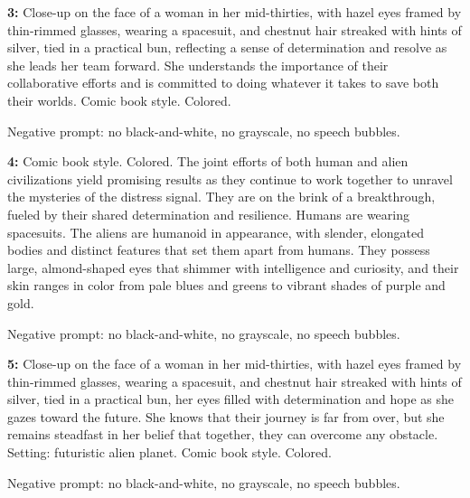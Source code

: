 \begin{iquote}
    \textbf{3:} Close-up on the face of a woman in her mid-thirties, with hazel eyes framed by thin-rimmed glasses, wearing a spacesuit, and chestnut hair streaked with hints of silver, tied in a practical bun, reflecting a sense of determination and resolve as she leads her team forward. She understands the importance of their collaborative efforts and is committed to doing whatever it takes to save both their worlds. Comic book style. Colored.

    \noindent Negative prompt: no black-and-white, no grayscale, no speech bubbles.
\end{iquote}

\begin{iquote}
    \textbf{4:} Comic book style. Colored. The joint efforts of both human and alien civilizations yield promising results as they continue to work together to unravel the mysteries of the distress signal. They are on the brink of a breakthrough, fueled by their shared determination and resilience. Humans are wearing spacesuits. The aliens are humanoid in appearance, with slender, elongated bodies and distinct features that set them apart from humans. They possess large, almond-shaped eyes that shimmer with intelligence and curiosity, and their skin ranges in color from pale blues and greens to vibrant shades of purple and gold. 

    \noindent Negative prompt: no black-and-white, no grayscale, no speech bubbles.
\end{iquote}

\begin{iquote}
    \textbf{5:} Close-up on the face of a woman in her mid-thirties, with hazel eyes framed by thin-rimmed glasses, wearing a spacesuit, and chestnut hair streaked with hints of silver, tied in a practical bun, her eyes filled with determination and hope as she gazes toward the future. She knows that their journey is far from over, but she remains steadfast in her belief that together, they can overcome any obstacle. Setting: futuristic alien planet. Comic book style. Colored.

    \noindent Negative prompt: no black-and-white, no grayscale, no speech bubbles.
\end{iquote}



